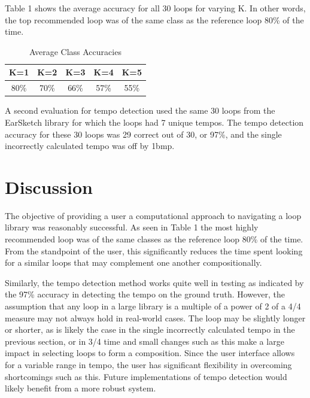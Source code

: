 \documentclass{article}
\begin{document}
Table 1 shows the average accuracy for all 30 loops for varying K. In other words, the top recommended loop was of the same class as the reference loop 80\% of the time.

\begin{table}[h!]
  \begin{center}
    \begin{tabular}{| c | c | c | c | c |}
    \hline
    K=1 & K=2 & K=3 & K=4 & K=5 \\
    \hline
    80\% & 70\% & 66\%  & 57\% & 55\% \\
    \hline
    \end{tabular}
  \end{center}
  \caption{Average Class Accuracies}
\end{table}

A second evaluation for tempo detection used the same 30 loops from the EarSketch library for which the loops had 7 unique tempos. The tempo detection accuracy for these 30 loops was 29 correct out of 30, or 97\%, and the single incorrectly calculated tempo was off by 1bmp.


\section{Discussion}

The objective of providing a user a computational approach to navigating a loop library was reasonably successful. As seen in Table 1 the most highly recommended loop was of the same classes as the reference loop 80\% of the time. From the standpoint of the user, this significantly reduces the time spent looking for a similar loops that may complement one another compositionally.

Similarly, the tempo detection method works quite well in testing as indicated by the 97\% accuracy in detecting the tempo on the ground truth. However, the assumption that any loop in a large library is a multiple of a power of 2 of a 4/4 measure may not always hold in real-world cases. The loop may be slightly longer or shorter, as is likely the case in the single incorrectly calculated tempo in the previous section, or in 3/4 time and small changes such as this make a large impact in selecting loops to form a composition. Since the user interface allows for a variable range in tempo, the user has significant flexibility in overcoming shortcomings such as this. Future implementations of tempo detection would likely benefit from a more robust system.
\end{document}
